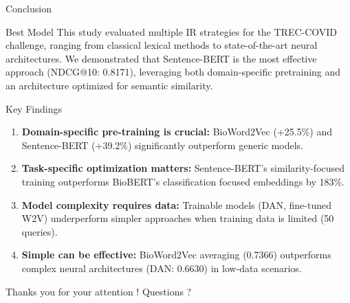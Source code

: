 \documentclass[10pt, french]{beamer}
\begin{document}
\begin{frame}{Conclusion}
    \begin{block}{Best Model}
        This study evaluated multiple IR strategies for the TREC-COVID
challenge, ranging from classical lexical methods to state-of-the-art
neural architectures. We demonstrated that Sentence-BERT is
the most effective approach (NDCG@10: 0.8171), leveraging both
domain-specific pretraining and an architecture optimized for semantic similarity.
    \end{block}
\begin{block}{Key Findings}
\begin{enumerate} 
\item \textbf{Domain-specific pre-training is crucial:} BioWord2Vec (+25.5\%) and Sentence-BERT (+39.2\%) significantly outperform generic models.
\item \textbf{Task-specific optimization matters:} Sentence-BERT's similarity-focused training outperforms BioBERT's classification focused embeddings by 183\%.
\item \textbf{Model complexity requires data:} Trainable models (DAN, fine-tuned W2V) underperform simpler approaches when training data is limited (50 queries). \item \textbf{Simple can be effective:} BioWord2Vec averaging (0.7366) outperforms complex neural architectures (DAN: 0.6630) in low-data scenarios. \end{enumerate}
    
\end{block}

    
\end{frame}



\begin{frame}{Thanks you for your attention !}
    \centering
    \Huge Questions ?
\end{frame}
\end{document}
